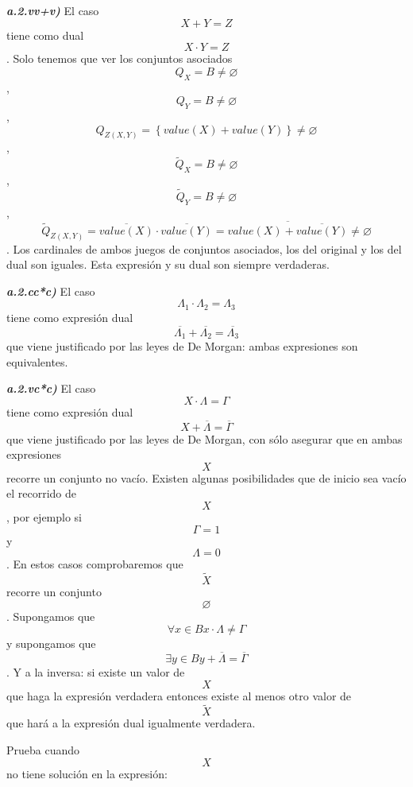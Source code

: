 \documentclass[
]{article}
\begin{document}
\begin{enumerate}
\begin{enumerate}
\begin{enumerate}
\begin{enumerate}
\begin{enumerate}
          \emph{\textbf{a.2.vv+v)}} El caso \[{X + Y} = Z\] tiene como
          dual \[{X \cdot Y} = Z\]. Solo tenemos que ver los conjuntos
          asociados \[{Q_{X} = B} \neq \varnothing\] ,
          \[{Q_{Y} = B} \neq \varnothing\] ,
          \[{Q_{Z{({X,Y})}} = \left\{ {{\mathit{value}{(X)}} + {\mathit{value}{(Y)}}} \right\}} \neq \varnothing\]
          , \[{{\widetilde{Q}}_{X} = B} \neq \varnothing\] ,
          \[{{\widetilde{Q}}_{Y} = B} \neq \varnothing\] ,
          \[{{{\widetilde{Q}}_{Z{({X,Y})}} = {\overline{\mathit{value}{(X)}} \cdot \overline{\mathit{value}{(Y)}}}} = \overline{{\mathit{value}{(X)}}+\overline{\mathit{value}{(Y)}}}} \neq \varnothing\]
          . Los cardinales de ambos jue\-gos de conjuntos asociados, los
          del original y los del dual son iguales. Esta expresión y su
          dual son siempre verdaderas.

          \emph{\textbf{a.2.cc*c)}} El caso
          \[{\Lambda_{1} \cdot \Lambda_{2}} = \Lambda_{3}\] tiene como
          expresión dual
          \[{\overline{\Lambda_{1}} + \overline{\Lambda_{2}}} = \overline{\Lambda_{3}}\]que
          viene justificado por las leyes de De Morgan: ambas
          expresiones son equivalentes.

          \emph{\textbf{a.2.vc*c)}} El caso
          \[{X \cdot \Lambda} = \Gamma\] tiene como expresión dual
          \[{X + \overline{\Lambda}} = \overline{\Gamma}\] que viene
          justificado por las leyes de De Morgan, con sólo asegurar que
          en am\-bas expresiones \[X\]recorre un conjunto no vacío.
          Existen algunas posibili\-dades que de inicio sea vacío el
          recorrido de \[X\], por ejemplo si \[\Gamma = 1\] y
          \[\Lambda = 0\]. En estos casos comprobaremos que
          \[\widetilde{X}\] recorre un conjunto \[\varnothing\].
          Supongamos que
          \[\forall{x \in B}{{x \cdot \Lambda} \neq \Gamma}\]y
          supongamos que
          \[\exists{y \in B}{{y + \overline{\Lambda}} = \overline{\Gamma}}\].
          Y a la inversa: si existe un valor de \[X\] que haga la
          expresión verdadera entonces existe al menos otro valor de
          \[\widetilde{X}\] que hará a la expresión dual igualmente
          verdadera.

          Prueba cuando \[X\] no tiene solución en la expresión:


\end{enumerate}
\end{enumerate}
\end{enumerate}
\end{enumerate}
\end{enumerate}
\end{document}
